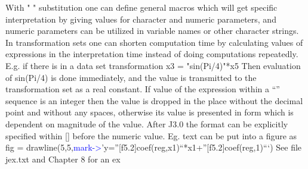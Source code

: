 With " " substitution one can define general macros which will get specific interpretation by
giving values for character and numeric parameters, and numeric parameters can be utilized in
variable names or other character strings. In transformation sets one can shorten computation
time by calculating values of expressions in the interpretation time instead of doing
computations repeatedly. E.g. if there is in a data set transformation
x3 = "\textcolor{VioletRed}{sin}(Pi/4)"*x5
Then evaluation of \textcolor{VioletRed}{sin}(Pi/4) is done immediately, and the value is transmitted to the
transformation set as a real constant.
If value of the expression within a “” sequence is an integer then the value is dropped in the
place without the decimal point and without any spaces, otherwise its value is presented in
form which is dependent on magnitude of the value. After J3.0 the format can be explicitly
specified within [] before the numeric value. Eg. text can be put into a figure as
fig =
\textcolor{VioletRed}{drawline}(5,5,\textcolor{blue}{mark->}’y=”[f5.2]coef(reg,x1)“*x1+”[f5.2]coef(reg,1)“‘)
See file jex.txt and Chapter 8 for an ex
